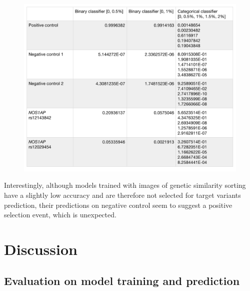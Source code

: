 \documentclass[a4paper,12pt,oneside]{extarticle}
\begin{document}
\begin{figure}[H] 
  \captionsetup{singlelinecheck = false, justification=justified}
  \centering
  \includegraphics[trim = 0 5mm 0 5mm, clip,width=1\textwidth]{table6.png}
\end{figure}

Interestingly, although models trained with images of genetic similarity sorting have a slightly low accuracy and are therefore not selected for target variants prediction, their predictions on negative control seem to suggest a positive selection event, which is unexpected.

\cleardoublepage\clearpage
\section{Discussion}

\subsection{Evaluation on model training and prediction}
\end{document}
